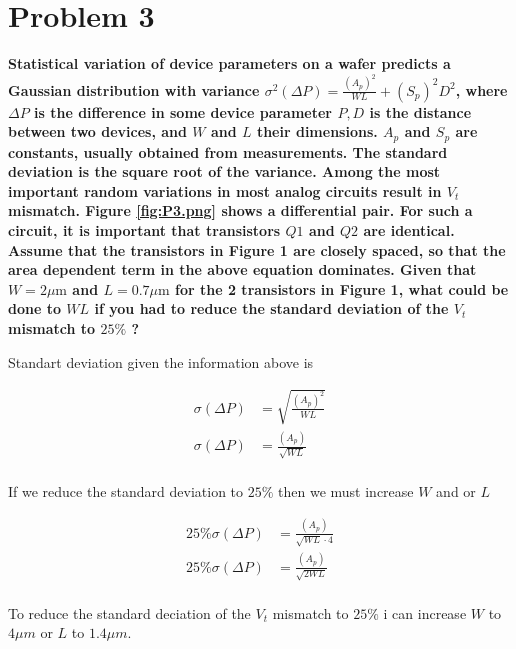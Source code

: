 \section{Problem 3}
\textbf{Statistical variation of device parameters on a wafer predicts a Gaussian distribution with variance \( \sigma^{2}(\Delta P)=\frac{\left(A_{p}\right)^{2}}{W L}+\left(S_{p}\right)^{2} D^{2} \), where \( \Delta P \) is the difference in some device parameter \( P, D \) is the distance between two devices, and \( W \) and \( L \) their dimensions. \( A_{p} \) and \( S_{p} \) are constants, usually obtained from measurements. The standard deviation is the square root of the variance. Among the most important random variations in most analog circuits result in \( V_{t} \) mismatch. Figure \ref{fig:P3.png} shows a differential pair. For such a circuit, it is important that transistors \( Q 1 \) and \( Q 2 \) are identical. Assume that the transistors in Figure 1 are closely spaced, so that the area dependent term in the above equation dominates. Given that \( W=2 \mu \mathrm{m} \) and \( L=0.7 \mu \mathrm{m} \) for the 2 transistors in Figure 1, what could be done to \( W L \) if you had to reduce the standard deviation of the \( V_{t} \) mismatch to \( 25 \% \) ?}


Standart deviation given the information above is 

\begin{align*}
    \sigma(\Delta P)&=\sqrt{\frac{\left(A_{p}\right)^{2}}{W L}}\\
    \sigma(\Delta P)&=\frac{\left(A_{p}\right)}{\sqrt{W L}}\\
\end{align*}

If we reduce the standard deviation to $25\%$ then we must increase $W$ and or $L$

\begin{align*}
    25\% \sigma(\Delta P)&=\frac{\left(A_{p}\right)}{\sqrt{W L}\cdot4}\\
    25\% \sigma(\Delta P)&=\frac{\left(A_{p}\right)}{\sqrt{2W L}}\\
\end{align*}

To reduce the standard deciation of the $V_t$ mismatch to $25\%$ i can increase $W$ to $4\mu m$ or $L$ to $1.4 \mu m$.